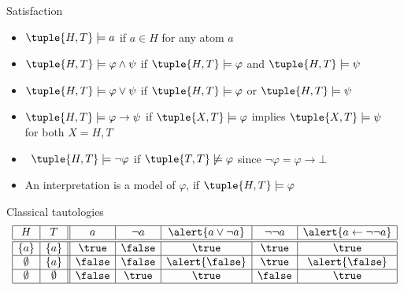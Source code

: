 \begin{frame}{Satisfaction}
  \begin{itemize}
  \item $\tuple{H,T} \models a$ if $a \in H$ \hfill for any atom $a$
  \item $\tuple{H,T} \models \varphi \wedge \psi$ if
    $\tuple{H,T} \models \varphi$
    and
    $\tuple{H,T} \models \psi$
  \item $\tuple{H,T} \models \varphi \vee \psi$ if
    $\tuple{H,T} \models \varphi$
    or
    $\tuple{H,T} \models \psi$

    \smallskip

  \item<2-> $\tuple{H,T} \models \varphi \rightarrow \psi$ if
    $\tuple{X,T} \models \varphi$ implies $\tuple{X,T} \models \psi$
    \\\qquad\qquad
    for both $X=H,T$

    \bigskip

  \item<3>  \ $\tuple{H,T} \models \neg\varphi$ if $\tuple{T,T} \not\models \varphi$
    \hfill since $\neg\varphi = \varphi\to\bot$

    \bigskip

  \item<4-> An interpretation  is a \alert{model} of $\varphi$, if $\tuple{H,T} \models \varphi$
  \end{itemize}
\end{frame}
\begin{frame}{Classical tautologies}
\centering
  \[
    \begin{array}{| c | c || c | c | c | c | c |}
      \hline
      H         & T          & a      & \neg a & \alert{a \vee \neg a} & \neg\neg a & \alert{a \leftarrow \neg\neg a}
      \\\hline\hline
      \{ a \}   & \{ a \}    & \true  & \false & \true                 & \true      & \true
      \\\hline
      \emptyset & \{ a \}    & \false & \false & \alert{\false}        & \true      & \alert{\false}
      \\\hline
      \emptyset & \emptyset  & \false & \true  & \true                 & \false     & \true
      \\\hline
    \end{array}
  \]
\end{frame}
